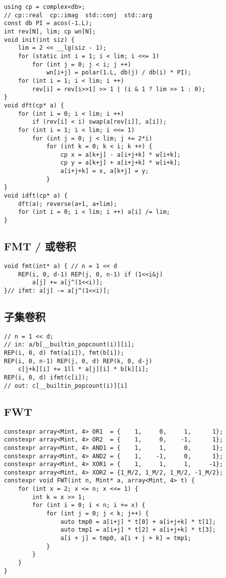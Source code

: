 \documentclass[a4paper,landscape,twocolumn]{ctexart}
\begin{document}
\begin{lstlisting}
using cp = complex<db>;
// cp::real  cp::imag  std::conj  std::arg
const db PI = acos(-1.L);
int rev[N], lim; cp wn[N];
void init(int siz) {
	lim = 2 << __lg(siz - 1);
	for (static int i = 1; i < lim; i <<= 1)
		for (int j = 0; j < i; j ++)
			wn[i+j] = polar(1.L, db(j) / db(i) * PI);
	for (int i = 1; i < lim; i ++)
		rev[i] = rev[i>>1] >> 1 | (i & 1 ? lim >> 1 : 0);
}
void dft(cp* a) {
	for (int i = 0; i < lim; i ++)
		if (rev[i] < i) swap(a[rev[i]], a[i]);
	for (int i = 1; i < lim; i <<= 1)
		for (int j = 0; j < lim; j += 2*i)
			for (int k = 0; k < i; k ++) {
				cp x = a[k+j] - a[i+j+k] * w[i+k];
				cp y = a[k+j] + a[i+j+k] * w[i+k];
				a[i+j+k] = x, a[k+j] = y;
			}
}
void idft(cp* a) {
	dft(a); reverse(a+1, a+lim);
	for (int i = 0; i < lim; i ++) a[i] /= lim;
}
\end{lstlisting}

\subsection{FMT / 或卷积}

\begin{lstlisting}
void fmt(int* a) { // n = 1 << d
	REP(i, 0, d-1) REP(j, 0, n-1) if (1<<i&j)
		a[j] += a[j^(1<<i)];
}// ifmt: a[j] -= a[j^(1<<i)];
\end{lstlisting}

\subsection{子集卷积}

\begin{lstlisting}
// n = 1 << d;
// in: a/b[__builtin_popcount(i)][i];
REP(i, 0, d) fmt(a[i]), fmt(b[i]);
REP(i, 0, n-1) REP(j, 0, d) REP(k, 0, d-j)
	c[j+k][i] += 1ll * a[j][i] * b[k][i];
REP(i, 0, d) ifmt(c[i]);
// out: c[__builtin_popcount(i)][i]
\end{lstlisting}

\subsection{FWT}

\begin{lstlisting}
constexpr array<Mint, 4> OR1  = {    1,     0,     1,      1};
constexpr array<Mint, 4> OR2  = {    1,     0,    -1,      1};
constexpr array<Mint, 4> AND1 = {    1,     1,     0,      1};
constexpr array<Mint, 4> AND2 = {    1,    -1,     0,      1};
constexpr array<Mint, 4> XOR1 = {    1,     1,     1,     -1};
constexpr array<Mint, 4> XOR2 = {1_M/2, 1_M/2, 1_M/2, -1_M/2};
constexpr void FWT(int n, Mint* a, array<Mint, 4> t) {
	for (int x = 2; x <= n; x <<= 1) {
		int k = x >> 1;
		for (int i = 0; i < n; i += x) {
			for (int j = 0; j < k; j++) {
				auto tmp0 = a[i+j] * t[0] + a[i+j+k] * t[1];
				auto tmp1 = a[i+j] * t[2] + a[i+j+k] * t[3];
				a[i + j] = tmp0, a[i + j + k] = tmp1;
			}
		}
	}
}
\end{lstlisting}
\end{document}
